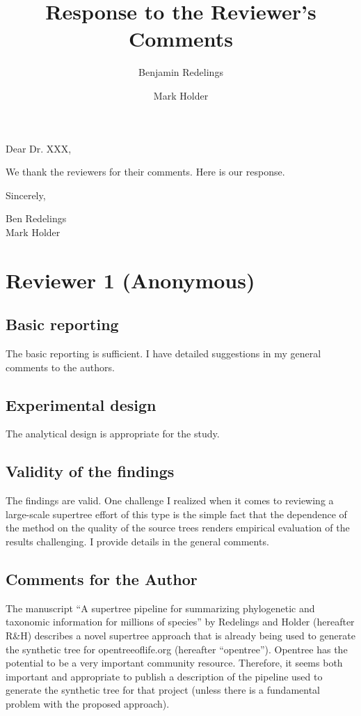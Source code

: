 \documentclass{article}
\title{Response to the Reviewer's Comments}
\author{Benjamin Redelings \and Mark Holder}
\begin{document}
\maketitle

Dear Dr. XXX,

We thank the reviewers for their comments.  Here is our response.

Sincerely,

Ben Redelings\\
Mark Holder

\clearpage

\section*{Reviewer 1 (Anonymous)}
\subsection*{Basic reporting}

The basic reporting is sufficient. I have detailed suggestions in my general comments to the authors.

\subsection*{Experimental design}

The analytical design is appropriate for the study.

\subsection*{Validity of the findings}

The findings are valid. One challenge I realized when it comes to reviewing a large-scale supertree effort of this type is the simple fact that the dependence of the method on the quality of the source trees renders empirical evaluation of the results challenging. I provide details in the general comments.

\subsection*{Comments for the Author}
The manuscript ``A supertree pipeline for summarizing phylogenetic and taxonomic information for millions of species'' by Redelings and Holder (hereafter R\&H) describes a novel supertree approach that is already being used to generate the synthetic tree for opentreeoflife.org (hereafter “opentree”). Opentree has the potential to be a very important community resource. Therefore, it seems both important and appropriate to publish a description of the pipeline used to generate the synthetic tree for that project (unless there is a fundamental problem with the proposed approach).
\end{document}
